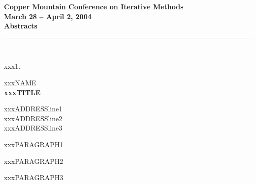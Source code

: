\documentclass{report}
\begin{document}
\begin{center}
{\Large \bf Copper Mountain Conference on Iterative Methods} \\
{\large \bf March 28 -- April 2, 2004} \\
{\huge \bf Abstracts}
\end{center}


\begin{center}
\rule{6in}{1pt}\\
{\large xxx1. \rule{0mm}{1.5em} xxxNAME \\
{\bf xxxTITLE }}
\end{center}

\begin{center}
	xxxADDRESSline1 \\
	xxxADDRESSline2 \\
	xxxADDRESSline3
\end{center}

xxxPARAGRAPH1

xxxPARAGRAPH2

xxxPARAGRAPH3
\end{document}
